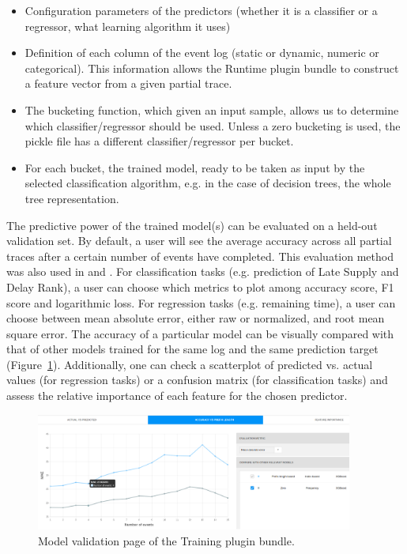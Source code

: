 \documentclass[runningheads,a4paper]{llncs}
\begin{document}
\begin{itemize}
	\item Configuration parameters of the predictors (whether it is a classifier or a regressor, what learning algorithm it uses)
	\item Definition of each column of the event log (static or dynamic, numeric or categorical). This information allows the Runtime plugin bundle to construct a feature vector from a given partial trace.
	\item The bucketing function, which given an input sample, allows us to determine which classifier/regressor should be used. Unless a zero bucketing is used, the pickle file has a different classifier/regressor per bucket.
	\item For each bucket, the trained model, ready to be taken as input by the selected classification algorithm, e.g. in the case of decision trees, the whole tree representation.
\end{itemize}

The predictive power of the trained model(s) can be evaluated on a held-out validation set. By default, a user will see the average accuracy across all partial traces after a certain number of events have completed. This evaluation method was also used in \cite{Leontjeva2015} and \cite{Teinemaa2017}. For classification tasks (e.g. prediction of Late Supply and Delay Rank), a user can choose which metrics to plot among accuracy score, F1 score and logarithmic loss. For regression tasks (e.g. remaining time), a user can choose between mean absolute error, either raw or normalized, and root mean square error. The accuracy of a particular model can be visually compared with that of other models trained for the same log and the same prediction target (Figure~\ref{fig:training-evaluation}). Additionally, one can check a scatterplot of predicted vs. actual values (for regression tasks) or a confusion matrix (for classification tasks) and assess the relative importance of each feature for the chosen predictor.

\begin{figure}[t]
	\centering
	\includegraphics[width=0.93\textwidth]{img/training-evaluation}
	\caption{Model validation page of the Training plugin bundle.}
	\label{fig:training-evaluation}
\end{figure}
\end{document}

